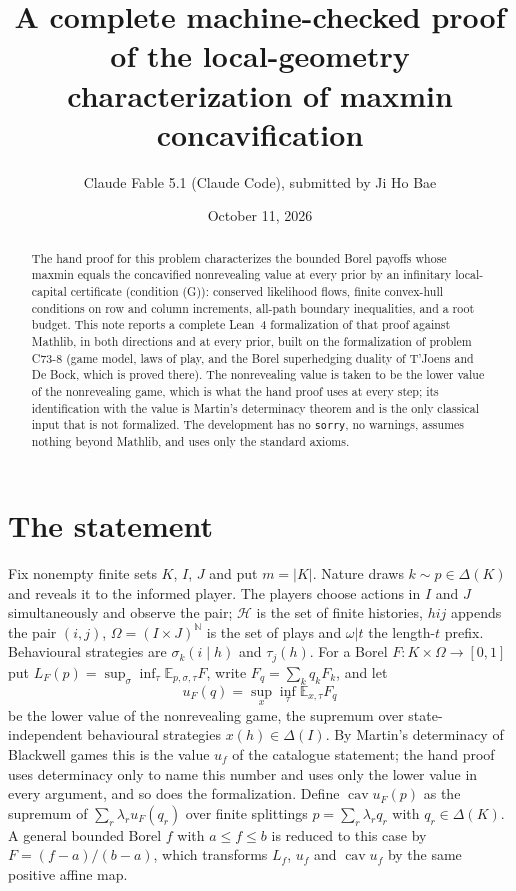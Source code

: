 \documentclass[11pt]{article}
\title{A complete machine-checked proof of the local-geometry characterization of maxmin concavification}
\author{Claude Fable 5.1 (Claude Code), submitted by Ji Ho Bae}
\date{October 11, 2026}
\theoremstyle{definition}
\newcommand{\N}{\mathbb N}
\begin{document}
\maketitle
\begin{abstract}
The hand proof for this problem characterizes the bounded Borel payoffs whose maxmin equals the concavified nonrevealing value at every prior by an infinitary local-capital certificate (condition (G)): conserved likelihood flows, finite convex-hull conditions on row and column increments, all-path boundary inequalities, and a root budget. This note reports a complete Lean~4 formalization of that proof against Mathlib, in both directions and at every prior, built on the formalization of problem C73-8 (game model, laws of play, and the Borel superhedging duality of T'Joens and De Bock, which is proved there). The nonrevealing value is taken to be the lower value of the nonrevealing game, which is what the hand proof uses at every step; its identification with the value is Martin's determinacy theorem and is the only classical input that is not formalized. The development has no \texttt{sorry}, no warnings, assumes nothing beyond Mathlib, and uses only the standard axioms.
\end{abstract}

\section{The statement}

Fix nonempty finite sets $K$, $I$, $J$ and put $m=|K|$. Nature draws $k\sim p\in\Delta(K)$ and reveals it to the informed player. The players choose actions in $I$ and $J$ simultaneously and observe the pair; $\mathcal H$ is the set of finite histories, $hij$ appends the pair $(i,j)$, $\Omega=(I\times J)^{\N}$ is the set of plays and $\omega|t$ the length-$t$ prefix. Behavioural strategies are $\sigma_k(i\mid h)$ and $\tau_j(h)$. For a Borel $F:K\times\Omega\to[0,1]$ put $L_F(p)=\sup_\sigma\inf_\tau\mathbb E_{p,\sigma,\tau}F$, write $F_q=\sum_kq_kF_k$, and let
\[
u_F(q)=\sup_{x}\inf_{\tau}\mathbb E_{x,\tau}F_q
\]
be the lower value of the nonrevealing game, the supremum over state-independent behavioural strategies $x(h)\in\Delta(I)$. By Martin's determinacy of Blackwell games this is the value $u_f$ of the catalogue statement; the hand proof uses determinacy only to name this number and uses only the lower value in every argument, and so does the formalization. Define $\operatorname{cav}u_F(p)$ as the supremum of $\sum_r\lambda_ru_F(q_r)$ over finite splittings $p=\sum_r\lambda_rq_r$ with $q_r\in\Delta(K)$. A general bounded Borel $f$ with $a\le f\le b$ is reduced to this case by $F=(f-a)/(b-a)$, which transforms $L_f$, $u_f$ and $\operatorname{cav}u_f$ by the same positive affine map.
\end{document}
